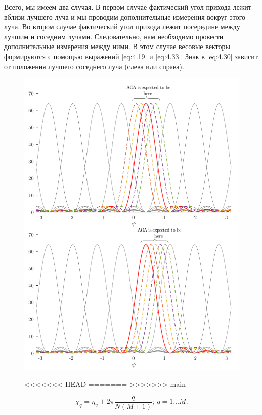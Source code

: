 Всего, мы имеем два случая. В первом случае фактический угол прихода лежит
вблизи лучшего луча и мы проводим дополнительные измерения вокруг этого луча.
Во втором случае фактический угол прихода лежит посередине между лучшим и соседним
лучами. Следовательно, нам необходимо провести дополнительные измерения между ними.
В этом случае весовые векторы  формируются с помощью выражений \eqref{eq:4.19} и \eqref{eq:4.33}.
Знак в \eqref{eq:4.30} зависит от положения лучшего соседнего луча (слева или справа).
\begin{figure}[ht]
    \centering
    \includegraphics{figs/fig4.12}
    \caption{}
<<<<<<< HEAD
    \label{fig:4.12}
=======
    \label{fig:4.120}
>>>>>>> main
\end{figure}

\begin{equation}
    \label{eq:4.33}
    \chi_q = \eta_v \pm 2\pi \frac{q}{N(M+1)}; ~ q = 1 \dots M.
\end{equation}


